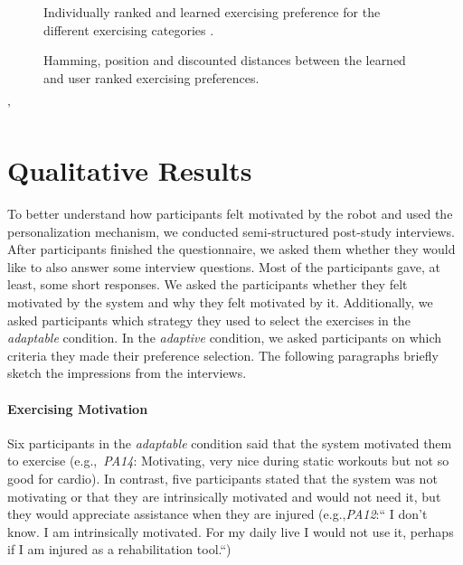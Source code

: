 \documentclass[twocolumn]{svjour3}          %
\begin{document}
\begin{figure}
 \caption{\label{fig:adapt:mot}Individually ranked and learned exercising preference for the different exercising categories .}\label{fig:userranking}
\end{figure}

\begin{figure}
 \caption{\label{fig:adapt:mot}Hamming, position and discounted distances between the learned and user ranked exercising preferences.}\label{fig:distances}
\end{figure}
'


\section{Qualitative Results}

To better understand how participants felt motivated by the robot and used the personalization mechanism, we conducted semi-structured post-study interviews. After participants finished the questionnaire, we asked them whether they would like to also answer some interview questions. Most of the participants gave, at least, some short responses. We asked the participants whether they felt motivated by the system and why they felt motivated by it. Additionally, we asked participants which strategy they used to select the exercises in the \textit{adaptable} condition. In the \textit{adaptive} condition, we asked participants on which criteria they made their preference selection. The following paragraphs briefly sketch the impressions from the interviews.


\paragraph{Exercising Motivation}
Six participants in the \textit{adaptable} condition said that the system motivated them to exercise (e.g.,~\textit{PA14}: Motivating, very nice during static workouts but not so good for cardio). In contrast, five participants stated that the system was not motivating or that they are intrinsically motivated and would not need it, but they would appreciate assistance when they are injured (e.g.,\textit{PA12}:`` I don't know. I am intrinsically motivated. For my daily live I would not use it, perhaps if I am injured as a rehabilitation tool.``)
\end{document}
